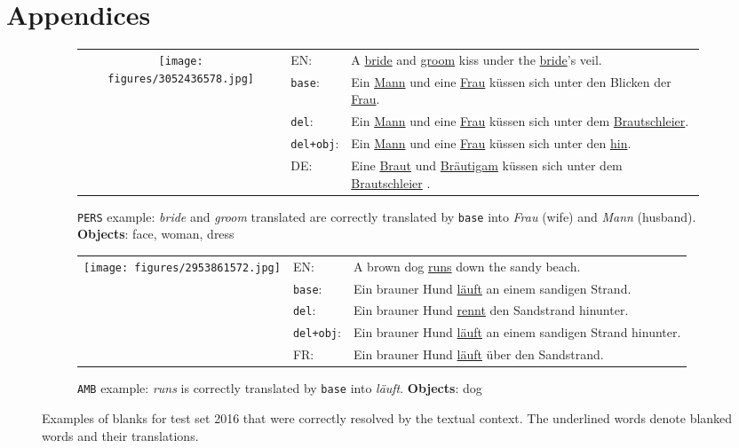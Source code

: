 \documentclass[11pt,a4paper]{article}
\newcommand{\base}{\texttt{base}\xspace}
\newcommand{\delib}{\texttt{del}\xspace}
\newcommand{\delibattobj}{\texttt{del+obj}\xspace}
\newcommand{\amb}{\texttt{AMB}\xspace}
\newcommand{\pers}{\texttt{PERS}\xspace}
\begin{document}
\section{Appendices}
\label{sec:appendix}
\begin{figure*}[ht!]
\small{
  \begin{subfigure}[c]{\textwidth}
    \begin{tabular}{c p{1.5cm}p{9cm}}
      \multirow{3}[15]{*}{\texttt{[image: figures/3052436578.jpg]}} & EN: & A \underline{bride} and \underline{groom} kiss under the \underline{bride}'s veil.\\[1ex]
      & \base: & Ein \underline{Mann} und eine \underline{Frau} k\"{u}ssen sich unter den Blicken der \underline{Frau}. \\[1ex]
      & \delib: & Ein \underline{Mann} und eine \underline{Frau} k\"{u}ssen sich unter dem \underline{Brautschleier}.\\[1ex]
      & \delibattobj: & Ein \underline{Mann} und eine \underline{Frau} k\"{u}ssen sich unter den \underline{hin}. \\[1ex]
      & DE: & Eine \underline{Braut} und \underline{Br\"{a}utigam} k\"{u}ssen sich unter dem \underline{Brautschleier} . \\[1ex]
  \end{tabular}
  \caption{\pers example: \textit{bride} and \textit{groom} translated are correctly translated by \base into \textit{Frau} (wife) and \textit{Mann} (husband). \textbf{Objects}: face, woman, dress}
  \end{subfigure}
  \begin{subfigure}[c]{\textwidth}
  \vspace{1em}
    \begin{tabular}{c p{1.5cm}p{9cm}}
      \multirow{3}[15]{*}{\texttt{[image: figures/2953861572.jpg]}} & EN: & A brown dog \underline{runs} down the sandy beach.\\[1ex]
      & \base: & Ein brauner Hund \underline{l\"{a}uft} an einem sandigen Strand.\\[1ex]
      & \delib: & Ein brauner Hund \underline{rennt} den Sandstrand hinunter. \\[1ex]
      & \delibattobj: & Ein brauner Hund \underline{l\"{a}uft} an einem sandigen Strand hinunter. \\[1ex]
      & FR: & Ein brauner Hund \underline{l\"{a}uft} \"{u}ber den Sandstrand. \\[1ex]
  \end{tabular}
  \caption{\amb example: \textit{runs} is correctly translated by \base into \textit{l\"{a}uft}. {\bf Objects}: dog}
  \end{subfigure}
   }
\caption{\label{table:gapped_ex1} Examples of blanks for test set 2016 that were correctly resolved by the textual context. The underlined words denote blanked words and their translations.}
\end{figure*}
\end{document}
